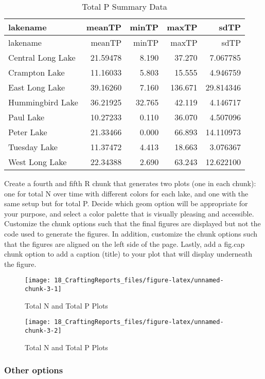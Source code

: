 \documentclass[]{article}
\begin{document}
\begin{longtable}[]{@{}lrrrr@{}}
\caption{Total P Summary Data}\tabularnewline
\toprule
lakename & meanTP & minTP & maxTP & sdTP\tabularnewline
\midrule
\endfirsthead
\toprule
lakename & meanTP & minTP & maxTP & sdTP\tabularnewline
\midrule
\endhead
Central Long Lake & 21.59478 & 8.190 & 37.270 & 7.067785\tabularnewline
Crampton Lake & 11.16033 & 5.803 & 15.555 & 4.946759\tabularnewline
East Long Lake & 39.16260 & 7.160 & 136.671 & 29.814346\tabularnewline
Hummingbird Lake & 36.21925 & 32.765 & 42.119 & 4.146717\tabularnewline
Paul Lake & 10.27233 & 0.110 & 36.070 & 4.507096\tabularnewline
Peter Lake & 21.33466 & 0.000 & 66.893 & 14.110973\tabularnewline
Tuesday Lake & 11.37472 & 4.413 & 18.663 & 3.076367\tabularnewline
West Long Lake & 22.34388 & 2.690 & 63.243 & 12.622100\tabularnewline
\bottomrule
\end{longtable}

Create a fourth and fifth R chunk that generates two plots (one in each
chunk): one for total N over time with different colors for each lake,
and one with the same setup but for total P. Decide which geom option
will be appropriate for your purpose, and select a color palette that is
visually pleasing and accessible. Customize the chunk options such that
the final figures are displayed but not the code used to generate the
figures. In addition, customize the chunk options such that the figures
are aligned on the left side of the page. Lastly, add a fig.cap chunk
option to add a caption (title) to your plot that will display
underneath the figure.

\begin{figure}

\texttt{[image: 18\_CraftingReports\_files/figure-latex/unnamed-chunk-3-1]} \hfill{}

\caption{Total N and Total P Plots}\label{fig:unnamed-chunk-31}
\end{figure}\begin{figure}

\texttt{[image: 18\_CraftingReports\_files/figure-latex/unnamed-chunk-3-2]} \hfill{}

\caption{Total N and Total P Plots}\label{fig:unnamed-chunk-32}
\end{figure}

\subsubsection{Other options}\label{other-options}
\end{document}
